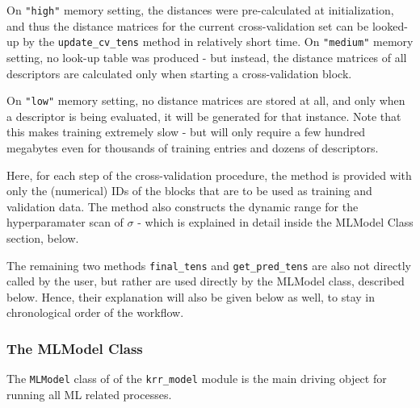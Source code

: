 \documentclass[12pt]{achemso}
\begin{document}
\noindent On \texttt{"high"} memory setting, the distances were pre-calculated at initialization, and thus the distance matrices for the current cross-validation set can be looked-up by the \texttt{update\_cv\_tens} method in relatively short time. On \texttt{"medium"} memory setting, no look-up table was produced - but instead, the distance matrices of all descriptors are calculated only when starting a cross-validation block.

\noindent On \texttt{"low"} memory setting, no distance matrices are stored at all, and only when a descriptor is being evaluated, it will be generated for that instance. Note that this makes training extremely slow - but will only require a few hundred megabytes even for thousands of training entries and dozens of descriptors.

\noindent Here, for each step of the cross-validation procedure, the method is provided with only the (numerical) IDs of the blocks that are to be used as training and validation data. The method also constructs the dynamic range for the hyperparamater scan of $\sigma$ - which is explained in detail inside the MLModel Class section, below. 

\noindent The remaining two methods \verb+final_tens+ and \verb+get_pred_tens+ are also not directly called by the user, but rather are used directly by the MLModel class, described below. Hence, their explanation will also be given below as well, to stay in chronological order of the workflow. 

\subsubsection{The MLModel Class}

\noindent The \verb+MLModel+ class of of the \verb+krr_model+ module is the main driving object for running all ML related processes.\\[-0.7em]

\vspace{1.0em}
\end{document}
